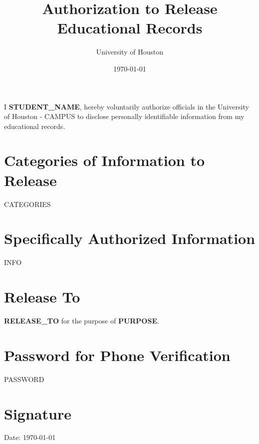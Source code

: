 \documentclass{article}
\begin{document}
\title{Authorization to Release Educational Records}
\author{University of Houston}
\date{\today}

\maketitle

\noindent
I \textbf{{STUDENT_NAME}}, hereby voluntarily authorize officials in the University of Houston - {CAMPUS} to disclose personally identifiable information from my educational records.

\section*{Categories of Information to Release}
{CATEGORIES}

\section*{Specifically Authorized Information}
{INFO}

\section*{Release To}
\textbf{{RELEASE_TO}} for the purpose of \textbf{{PURPOSE}}.

\section*{Password for Phone Verification}
{PASSWORD}

\section*{Signature}
\begin{center}
\end{center}

\vfill
\noindent
Date: \today
\end{document}
